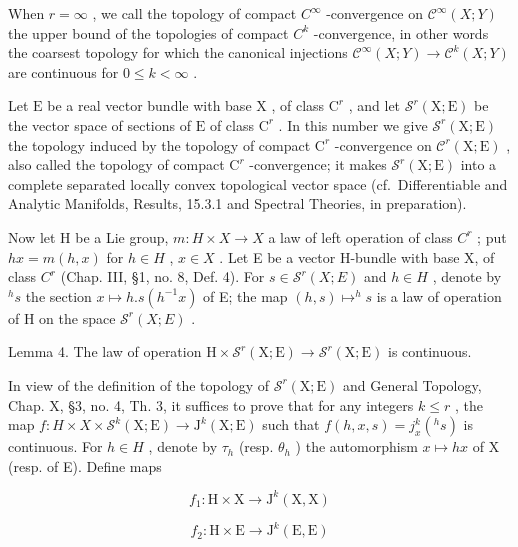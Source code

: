 When \(r = \infty\) , we call the topology of compact \(C^{\infty}\) -convergence on \(\mathcal{C}^{\infty}(X;Y)\) the upper bound of the topologies of compact \(C^{k}\) -convergence, in other words the coarsest topology for which the canonical injections \(\mathcal{C}^{\infty}(X;Y) \to \mathcal{C}^{k}(X;Y)\) are continuous for \(0 \leq k < \infty\) .

Let \(\mathrm{E}\) be a real vector bundle with base \(\mathrm{X}\) , of class \(\mathrm{C}^r\) , and let \(\mathcal{S}^r(\mathrm{X};\mathrm{E})\) be the vector space of sections of \(\mathrm{E}\) of class \(\mathrm{C}^r\) . In this number we give \(\mathcal{S}^r(\mathrm{X};\mathrm{E})\) the topology induced by the topology of compact \(\mathrm{C}^r\) -convergence on \(\mathcal{C}^r(\mathrm{X};\mathrm{E})\) , also called the topology of compact \(\mathrm{C}^r\) -convergence; it makes \(\mathcal{S}^r (\mathrm{X};\mathrm{E})\) into a complete separated locally convex topological vector space (cf.~Differentiable and Analytic Manifolds, Results, 15.3.1 and Spectral Theories, in preparation).

Now let H be a Lie group, \(m: H \times X \to X\) a law of left operation of class \(C^{r}\) ; put \(hx = m(h, x)\) for \(h \in H\) , \(x \in X\) . Let E be a vector H-bundle with base X, of class \(C^{r}\) (Chap. III, §1, no. 8, Def. 4). For \(s \in \mathcal{S}^{r}(X; E)\) and \(h \in H\) , denote by \(^{h}s\) the section \(x \mapsto h.s(h^{-1}x)\) of E; the map \((h, s) \mapsto ^{h}s\) is a law of operation of H on the space \(\mathcal{S}^{r}(X; E)\) .

Lemma 4. The law of operation \(\mathrm{H} \times \mathcal{S}^r (\mathrm{X};\mathrm{E}) \to \mathcal{S}^r (\mathrm{X};\mathrm{E})\) is continuous.

In view of the definition of the topology of \(\mathcal{S}^{r}(\mathrm{X};\mathrm{E})\) and General Topology, Chap. X, §3, no. 4, Th. 3, it suffices to prove that for any integers \(k \leq r\) , the map \(f : H \times X \times \mathcal{S}^{k}(\mathrm{X};\mathrm{E}) \to \mathrm{J}^{k}(\mathrm{X};\mathrm{E})\) such that \(f(h,x,s) = j_{x}^{k}(^{h}s)\) is continuous. For \(h \in H\) , denote by \(\tau_{h}\) (resp. \(\theta_{h}\) ) the automorphism \(x \mapsto hx\) of X (resp. of E). Define maps

\[
f _ {1}: \mathrm{H} \times \mathrm{X} \to \mathrm{J} ^ {k} (\mathrm{X}, \mathrm{X})
\]

\[
f _ {2}: \mathrm{H} \times \mathrm{E} \rightarrow \mathrm{J} ^ {k} (\mathrm{E}, \mathrm{E})
\]

